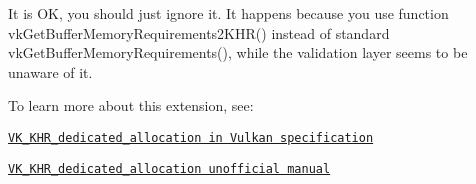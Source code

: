 It is OK, you should just ignore it. It happens because you use function {\ttfamily vk\+Get\+Buffer\+Memory\+Requirements2\+K\+H\+R()} instead of standard {\ttfamily vk\+Get\+Buffer\+Memory\+Requirements()}, while the validation layer seems to be unaware of it.

To learn more about this extension, see\+:


\begin{DoxyItemize}
\item \href{https://www.khronos.org/registry/vulkan/specs/1.0-extensions/html/vkspec.html#VK_KHR_dedicated_allocation}{\tt V\+K\+\_\+\+K\+H\+R\+\_\+dedicated\+\_\+allocation in Vulkan specification}
\item \href{http://asawicki.info/articles/VK_KHR_dedicated_allocation.php5}{\tt V\+K\+\_\+\+K\+H\+R\+\_\+dedicated\+\_\+allocation unofficial manual} 
\end{DoxyItemize}
